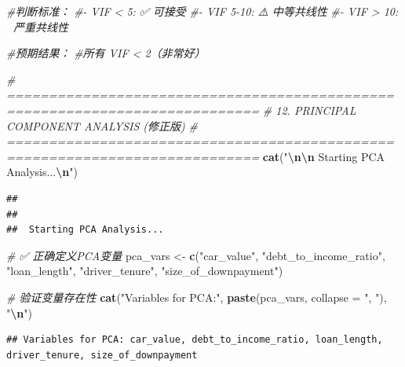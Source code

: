 \documentclass[
]{article}
\newenvironment{Shaded}{\begin{snugshade}}{\end{snugshade}}
\newcommand{\AttributeTok}[1]{\textcolor[rgb]{0.13,0.29,0.53}{#1}}
\newcommand{\CommentTok}[1]{\textcolor[rgb]{0.56,0.35,0.01}{\textit{#1}}}
\newcommand{\FunctionTok}[1]{\textcolor[rgb]{0.13,0.29,0.53}{\textbf{#1}}}
\newcommand{\NormalTok}[1]{#1}
\newcommand{\OtherTok}[1]{\textcolor[rgb]{0.56,0.35,0.01}{#1}}
\newcommand{\SpecialCharTok}[1]{\textcolor[rgb]{0.81,0.36,0.00}{\textbf{#1}}}
\newcommand{\StringTok}[1]{\textcolor[rgb]{0.31,0.60,0.02}{#1}}
\begin{document}
\begin{Shaded}
\begin{Highlighting}[]
\CommentTok{\#判断标准：}
\CommentTok{\#{-} VIF \textless{} 5: ✅ 可接受}
\CommentTok{\#{-} VIF 5{-}10: ⚠️ 中等共线性}
\CommentTok{\#{-} VIF \textgreater{} 10: 🚨 严重共线性}

\CommentTok{\#预期结果：}
\CommentTok{\#所有 VIF \textless{} 2（非常好）}
\end{Highlighting}
\end{Shaded}

\begin{Shaded}
\begin{Highlighting}[]
\CommentTok{\# ============================================================================}
\CommentTok{\# 12. PRINCIPAL COMPONENT ANALYSIS (修正版)}
\CommentTok{\# ============================================================================}
\FunctionTok{cat}\NormalTok{(}\StringTok{"}\SpecialCharTok{\textbackslash{}n\textbackslash{}n}\StringTok{ Starting PCA Analysis...}\SpecialCharTok{\textbackslash{}n}\StringTok{"}\NormalTok{)}
\end{Highlighting}
\end{Shaded}

\begin{verbatim}
## 
## 
##  Starting PCA Analysis...
\end{verbatim}

\begin{Shaded}
\begin{Highlighting}[]
\CommentTok{\# ✅ 正确定义PCA变量}
\NormalTok{pca\_vars }\OtherTok{\textless{}{-}} \FunctionTok{c}\NormalTok{(}\StringTok{"car\_value"}\NormalTok{, }\StringTok{"debt\_to\_income\_ratio"}\NormalTok{, }\StringTok{"loan\_length"}\NormalTok{, }
              \StringTok{"driver\_tenure"}\NormalTok{, }\StringTok{"size\_of\_downpayment"}\NormalTok{)}

\CommentTok{\# 验证变量存在性}
\FunctionTok{cat}\NormalTok{(}\StringTok{"Variables for PCA:"}\NormalTok{, }\FunctionTok{paste}\NormalTok{(pca\_vars, }\AttributeTok{collapse =} \StringTok{", "}\NormalTok{), }\StringTok{"}\SpecialCharTok{\textbackslash{}n}\StringTok{"}\NormalTok{)}
\end{Highlighting}
\end{Shaded}

\begin{verbatim}
## Variables for PCA: car_value, debt_to_income_ratio, loan_length, driver_tenure, size_of_downpayment
\end{verbatim}
\end{document}
